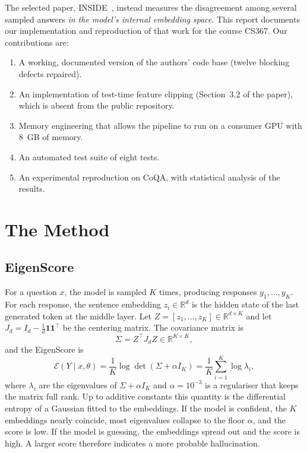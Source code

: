 \documentclass[conference]{IEEEtran}
\begin{document}
The selected paper, INSIDE~\cite{chen2024inside}, instead measures the disagreement among several sampled answers \emph{in the model's internal embedding space}. This report documents our implementation and reproduction of that work for the course CS367. Our contributions are:
\begin{enumerate}
  \item A working, documented version of the authors' code base (twelve blocking defects repaired).
  \item An implementation of test-time feature clipping (Section~3.2 of the paper), which is absent from the public repository.
  \item Memory engineering that allows the pipeline to run on a consumer GPU with 8~GB of memory.
  \item An automated test suite of eight tests.
  \item An experimental reproduction on CoQA, with statistical analysis of the results.
\end{enumerate}

\section{The Method}
\subsection{EigenScore}
For a question $x$, the model is sampled $K$ times, producing responses $y_1,\dots,y_K$. For each response, the sentence embedding $z_i\in\mathbb{R}^d$ is the hidden state of the last generated token at the middle layer. Let $Z=[z_1,\dots,z_K]\in\mathbb{R}^{d\times K}$ and let $J_d=I_d-\tfrac1d\mathbf{1}\mathbf{1}^\top$ be the centering matrix. The covariance matrix is
\begin{equation}
\Sigma = Z^\top J_d Z \in \mathbb{R}^{K\times K},
\end{equation}
and the EigenScore is
\begin{equation}
\mathcal{E}(Y\mid x,\theta)=\frac1K\log\det(\Sigma+\alpha I_K)=\frac1K\sum_{i=1}^{K}\log\lambda_i,
\end{equation}
where $\lambda_i$ are the eigenvalues of $\Sigma+\alpha I_K$ and $\alpha=10^{-3}$ is a regulariser that keeps the matrix full rank. Up to additive constants this quantity is the differential entropy of a Gaussian fitted to the embeddings. If the model is confident, the $K$ embeddings nearly coincide, most eigenvalues collapse to the floor $\alpha$, and the score is low. If the model is guessing, the embeddings spread out and the score is high. A larger score therefore indicates a more probable hallucination.
\end{document}
